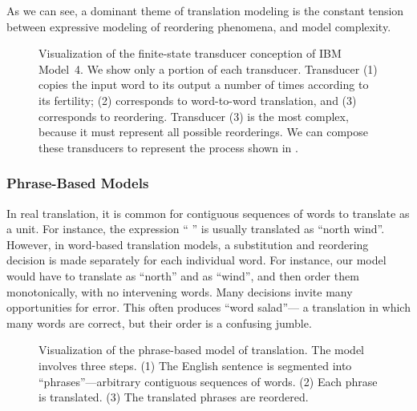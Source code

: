 As we can see, a dominant theme of translation modeling is the 
constant tension between expressive modeling of reordering 
phenomena, and model complexity.

\figpreamble
\begin{figure*}[t]
\figfontsize{\begin{center}

\end{center}}
\figpostamble
\caption[Visualization of the finite-state transducer conception of IBM Model~4.]{\label{fig:fst}Visualization of the finite-state
transducer conception of IBM Model~4.  We show only a portion
of each transducer.  Transducer (1) copies the input word 
to its output a number of times according to its fertility;
(2) corresponds to word-to-word translation, and (3)
corresponds to reordering.  Transducer (3) is the most 
complex, because it must represent all possible reorderings.
We can compose these transducers to represent
the process shown in .  }
\end{figure*}


\subsubsection{Phrase-Based Models}\label{sec:phrase-based-models}

In real translation, it is common for contiguous
sequences of words to translate as a unit.  For instance,
the expression `` '' is usually translated
as ``north wind''.
However, in word-based translation models, a substitution 
and reordering decision is made separately
for each individual word.  For instance, our model would have 
to translate  as ``north'' and  as ``wind'', and
then order them monotonically, with no intervening words.
Many decisions invite many opportunities for error. 
This often produces ``word salad''---
a translation in which many words are correct, but
their order is a confusing jumble. 

\figpreamble
\begin{figure*}[t]
\figfontsize{\begin{center}

\end{center}}
\figpostamble
\caption[Visualization of the phrase-based model of translation.]{\label{fig:pbsmt}Visualization of the phrase-based model of translation.
The model involves three steps.  (1) The English sentence is segmented into 
``phrases''---arbitrary contiguous sequences of words. (2) Each phrase is 
translated. (3) The translated phrases are reordered.}
\end{figure*}

